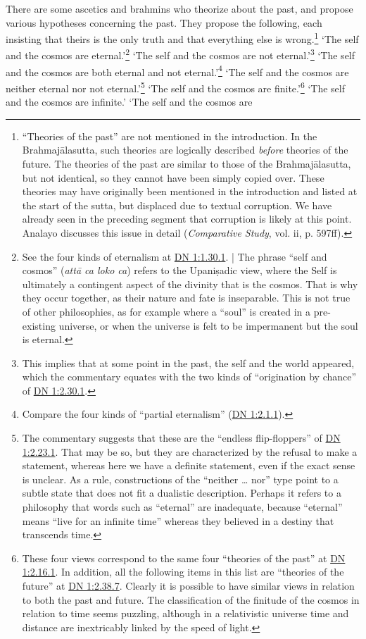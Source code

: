 \documentclass[12pt,openany]{book}%
\begin{document}
There are some ascetics and brahmins who theorize about the past, and propose various hypotheses concerning the past. They propose the following, each insisting that theirs is the only truth and that everything else is wrong.\footnote{“Theories of the past” are not mentioned in the introduction. In the \textsanskrit{Brahmajālasutta}, such theories are logically described \emph{before} theories of the future. The theories of the past are similar to those of the \textsanskrit{Brahmajālasutta}, but not identical, so they cannot have been simply copied over. These theories may have originally been mentioned in the introduction and listed at the start of the sutta, but displaced due to textual corruption. We have already seen in the preceding segment that corruption is likely at this point. Analayo discusses this issue in detail (\emph{Comparative Study}, vol. ii, p. 597ff). } ‘The self and the cosmos are eternal.’\footnote{See the four kinds of eternalism at \href{https://suttacentral.net/dn1/en/sujato\#1.30.1}{DN 1:1.30.1}. | The phrase “self and cosmos” (\textit{\textsanskrit{attā} ca loko ca}) refers to the \textsanskrit{Upaniṣadic} view, where the Self is ultimately a contingent aspect of the divinity that is the cosmos. That is why they occur together, as their nature and fate is inseparable. This is not true of other philosophies, as for example where a “soul” is created in a pre-existing universe, or when the universe is felt to be impermanent but the soul is eternal. } ‘The self and the cosmos are not eternal.’\footnote{This implies that at some point in the past, the self and the world appeared, which the commentary equates with the two kinds of “origination by chance” of \href{https://suttacentral.net/dn1/en/sujato\#2.30.1}{DN 1:2.30.1}. } ‘The self and the cosmos are both eternal and not eternal.’\footnote{Compare the four kinds of “partial eternalism” (\href{https://suttacentral.net/dn1/en/sujato\#2.1.1}{DN 1:2.1.1}). } ‘The self and the cosmos are neither eternal nor not eternal.’\footnote{The commentary suggests that these are the “endless flip-floppers” of \href{https://suttacentral.net/dn1/en/sujato\#2.23.1}{DN 1:2.23.1}. That may be so, but they are characterized by the refusal to make a statement, whereas here we have a definite statement, even if the exact sense is unclear. As a rule, constructions of the “neither … nor” type point to a subtle state that does not fit a dualistic description. Perhaps it refers to a philosophy that words such as “eternal” are inadequate, because “eternal” means “live for an infinite time” whereas they believed in a destiny that transcends time. } ‘The self and the cosmos are finite.’\footnote{These four views correspond to the same four “theories of the past” at \href{https://suttacentral.net/dn1/en/sujato\#2.16.1}{DN 1:2.16.1}. In addition, all the following items in this list are “theories of the future” at \href{https://suttacentral.net/dn1/en/sujato\#2.38.7}{DN 1:2.38.7}. Clearly it is possible to have similar views in relation to both the past and future. The classification of the finitude of the cosmos in relation to time seems puzzling, although in a relativistic universe time and distance are inextricably linked by the speed of light. } ‘The self and the cosmos are infinite.’ ‘The self and the cosmos are 
\end{document}
